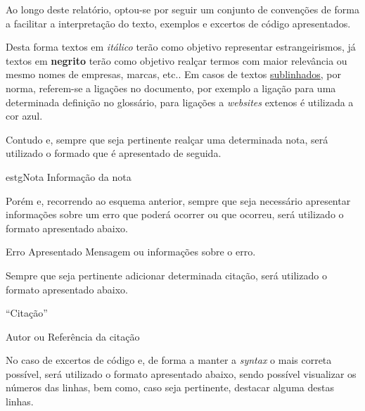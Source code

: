 
Ao longo deste relatório, optou-se por seguir um conjunto de convenções de forma a facilitar a interpretação do texto, exemplos e excertos de código apresentados.

Desta forma textos em \textit{itálico} terão como objetivo representar estrangeirismos, já textos em \textbf{negrito} terão como objetivo realçar termos com maior relevância ou mesmo nomes de empresas, marcas, etc.. Em casos de textos \underline{sublinhados}, por norma, referem-se a ligações no documento, por exemplo a ligação para uma determinada definição no glossário, para ligações a \textit{websites} extenos é utilizada a cor {\color{blue}azul}.

Contudo e, sempre que seja pertinente realçar uma determinada nota, será utilizado o formado que é apresentado de seguida.

\vspace{0.01cm}

\begin{mybox}{estg}{Nota}
	Informação da nota
\end{mybox}

\vspace{0.1cm}

Porém e, recorrendo ao esquema anterior, sempre que seja necessário apresentar informações sobre um erro que poderá ocorrer ou que ocorreu, será utilizado o formato apresentado abaixo.

\vspace{0.01cm}

\begin{errorbox}{Erro Apresentado}
Mensagem ou informações sobre o erro.
\end{errorbox}

\vspace{0.1cm}

Sempre que seja pertinente adicionar determinada citação, será utilizado o formato apresentado abaixo.

\begin{flushright}
	\begin{quotebox50}
		``Citação''

		\tcblower

		Autor ou Referência da citação
	\end{quotebox50}
\end{flushright}

\vspace{0.1cm}

No caso de excertos de código e, de forma a manter a \textit{syntax} o mais correta possível, será utilizado o formato apresentado abaixo, sendo possível visualizar os números das linhas, bem como, caso seja pertinente, destacar alguma destas linhas.

